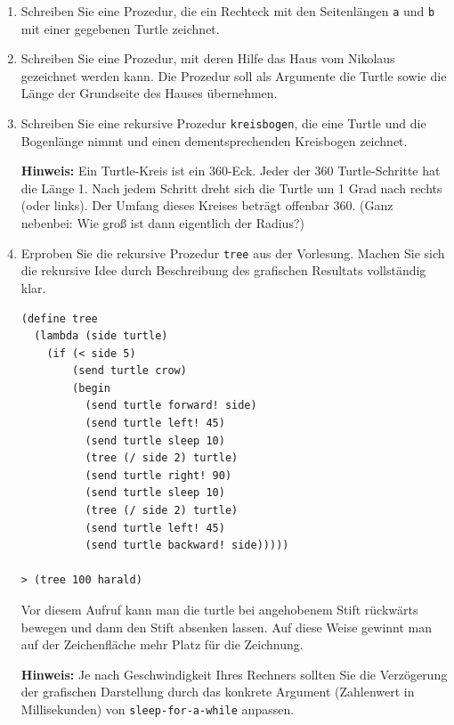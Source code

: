 \documentclass[12pt,a4paper]{scrartcl}
\begin{document}
\begin{enumerate}

\item Schreiben Sie eine Prozedur, die ein Rechteck mit den Seitenl\"{a}ngen
\texttt{a} und \texttt{b} mit einer gegebenen Turtle zeichnet.

\item Schreiben Sie eine Prozedur, mit deren Hilfe das Haus vom Nikolaus gezeichnet werden kann.
Die Prozedur soll als Argumente die Turtle sowie die L\"{a}nge der Grundseite des Hauses \"{u}bernehmen.

\item Schreiben Sie eine rekursive Prozedur \texttt{kreisbogen}, die eine Turtle und
die Bogenl\"{a}nge nimmt und einen dementsprechenden Kreisbogen zeichnet.

\textbf{Hinweis:} Ein Turtle-Kreis ist ein 360-Eck. Jeder der 360
Turtle-Schritte hat die L\"{a}nge 1. Nach jedem Schritt dreht sich die Turtle um 1
Grad nach rechts (oder links). Der Umfang dieses Kreises betr\"{a}gt offenbar 360.
(Ganz nebenbei: Wie gro{\ss} ist dann eigentlich der Radius?)

\newpage

\item Erproben Sie die rekursive Prozedur \texttt{tree} aus der Vorlesung. Machen Sie sich die rekursive Idee durch Beschreibung des grafischen Resultats vollständig klar.
\begin{verbatim}
(define tree
  (lambda (side turtle)
    (if (< side 5) 
        (send turtle crow)
        (begin
          (send turtle forward! side)
          (send turtle left! 45)
          (send turtle sleep 10)
          (tree (/ side 2) turtle)
          (send turtle right! 90)
          (send turtle sleep 10)
          (tree (/ side 2) turtle)
          (send turtle left! 45)
          (send turtle backward! side)))))
         
> (tree 100 harald)    
\end{verbatim}

Vor diesem Aufruf kann man die turtle bei angehobenem Stift r\"{u}ckw\"{a}rts bewegen und dann den Stift absenken lassen.
Auf diese Weise gewinnt man auf der Zeichenfläche mehr Platz f\"{u}r die Zeichnung.
%

\textbf{Hinweis:} Je nach Geschwindigkeit Ihres Rechners sollten Sie die Verz\"{o}gerung der grafischen Darstellung durch das konkrete Argument (Zahlenwert in Millisekunden) von \texttt{sleep-for-a-while} anpassen.


\end{enumerate}
\end{document}
